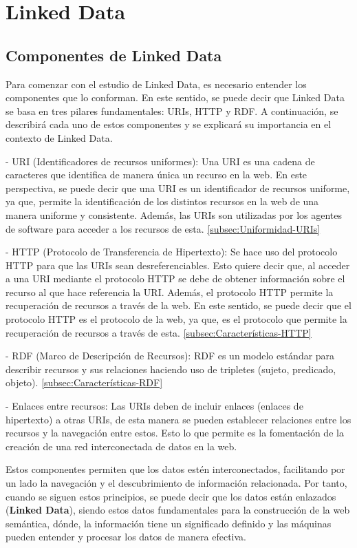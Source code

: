 \documentclass[11pt]{report}
\begin{document}
\chapter{Linked Data}

\section{Componentes de Linked Data}

Para comenzar con el estudio de Linked Data, es necesario entender los componentes que lo conforman. En este sentido, se puede decir que Linked Data se basa en tres pilares fundamentales: URIs, HTTP y RDF. A continuación, se describirá cada uno de estos componentes y se explicará su importancia en el contexto de Linked Data.

- URI (Identificadores de recursos uniformes): Una URI es una cadena de caracteres que identifica de manera única un recurso en la web. En este perspectiva, se puede decir que una URI es un identificador de recursos uniforme, ya que, permite la identificación de los distintos recursos en la web de una manera uniforme y consistente. Además, las URIs son utilizadas por los agentes de software para acceder a los recursos de esta. \ref{subsec:Uniformidad-URIs}

- HTTP (Protocolo de Transferencia de Hipertexto): Se hace uso del protocolo HTTP para que las URIs sean desreferenciables. Esto quiere decir que, al acceder a una URI mediante el protocolo HTTP se debe de obtener información sobre el recurso al que hace referencia la URI. Además, el protocolo HTTP permite la recuperación de recursos a través de la web. En este sentido, se puede decir que el protocolo HTTP es el protocolo de la web, ya que, es el protocolo que permite la recuperación de recursos a través de esta. \ref{subsec:Características-HTTP}

- RDF (Marco de Descripción de Recursos): RDF es un modelo estándar para describir recursos y sus relaciones haciendo uso de tripletes (sujeto, predicado, objeto). \ref{subsec:Características-RDF}

- Enlaces entre recursos: Las URIs deben de incluir enlaces (enlaces de hipertexto) a otras URIs, de esta manera se pueden establecer relaciones entre los recursos y la navegación entre estos. Esto lo que permite es la fomentación de la creación de una red interconectada de datos en la web.

Estos componentes permiten que los datos estén interconectados, facilitando por un lado la navegación y el descubrimiento de información relacionada. Por tanto, cuando se siguen estos principios, se puede decir que los datos están enlazados (\textbf{Linked Data}), siendo estos datos fundamentales para la construcción de la web semántica, dónde, la información tiene un significado definido y las máquinas pueden entender y procesar los datos de manera efectiva.
\end{document}
